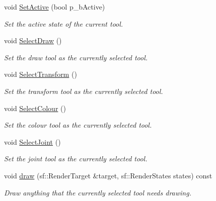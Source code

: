 \begin{DoxyCompactItemize}
\mbox{\label{class_tool_box_a69078e5a71a14b9103f981762b5d7860}} 
void \hyperlink{class_tool_box_a69078e5a71a14b9103f981762b5d7860}{Set\+Active} (bool p\+\_\+b\+Active)
\begin{DoxyCompactList}\small\item\em Set the active state of the current tool. \end{DoxyCompactList}\item 
\mbox{\label{class_tool_box_a5d8f199ab6a81fd41e6f6052d87b170d}} 
void \hyperlink{class_tool_box_a5d8f199ab6a81fd41e6f6052d87b170d}{Select\+Draw} ()
\begin{DoxyCompactList}\small\item\em Set the draw tool as the currently selected tool. \end{DoxyCompactList}\item 
\mbox{\label{class_tool_box_a441285f2023171e76dec4241cdd51b0b}} 
void \hyperlink{class_tool_box_a441285f2023171e76dec4241cdd51b0b}{Select\+Transform} ()
\begin{DoxyCompactList}\small\item\em Set the transform tool as the currently selected tool. \end{DoxyCompactList}\item 
\mbox{\label{class_tool_box_a32473bb26bb4c4a7f98866cf8b435c4e}} 
void \hyperlink{class_tool_box_a32473bb26bb4c4a7f98866cf8b435c4e}{Select\+Colour} ()
\begin{DoxyCompactList}\small\item\em Set the colour tool as the currently selected tool. \end{DoxyCompactList}\item 
\mbox{\label{class_tool_box_a07c9c626ce1c9002084303a5b6cd3e27}} 
void \hyperlink{class_tool_box_a07c9c626ce1c9002084303a5b6cd3e27}{Select\+Joint} ()
\begin{DoxyCompactList}\small\item\em Set the joint tool as the currently selected tool. \end{DoxyCompactList}\item 
\mbox{\label{class_tool_box_a95b5c8ae8056d48eec3ea16bac91af62}} 
void \hyperlink{class_tool_box_a95b5c8ae8056d48eec3ea16bac91af62}{draw} (sf\+::\+Render\+Target \&target, sf\+::\+Render\+States states) const
\begin{DoxyCompactList}\small\item\em Draw anything that the currently selected tool needs drawing. \end{DoxyCompactList}\end{DoxyCompactItemize}
